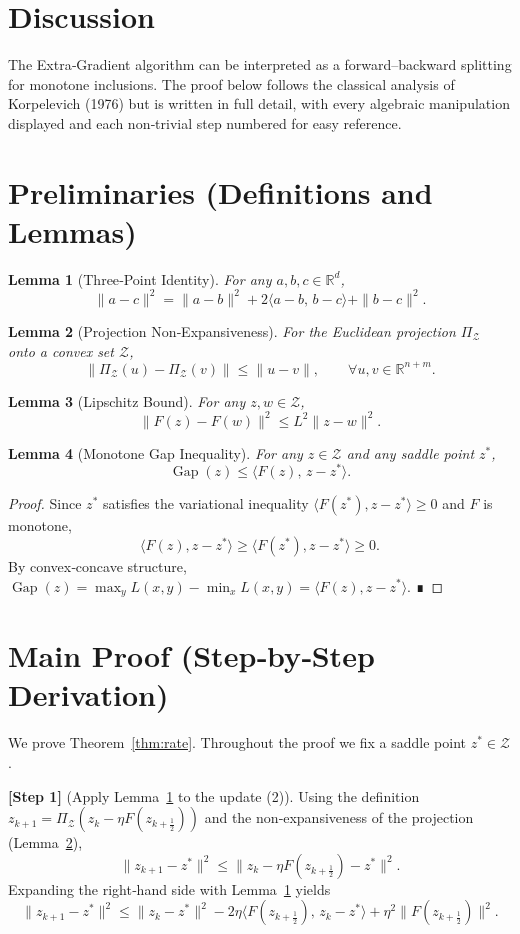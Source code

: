 \documentclass{article}
\newtheorem{lemma}{Lemma}
\newcommand{\R}{\mathbb{R}}
\newcommand{\gap}{\operatorname{Gap}}
\begin{document}
\section*{Discussion}
The Extra‑Gradient algorithm can be interpreted as a forward–backward splitting for monotone inclusions.  The proof below follows the classical analysis of Korpelevich (1976) but is written in full detail, with every algebraic manipulation displayed and each non‑trivial step numbered for easy reference.

\newpage
\section*{Preliminaries (Definitions and Lemmas)}
\begin{lemma}[Three‑Point Identity]\label{lem:3pt}
For any $a,b,c\in\R^{d}$,
\[
\|a-c\|^{2}= \|a-b\|^{2}+2\langle a-b,\,b-c\rangle+\|b-c\|^{2}.
\]
\end{lemma}
\begin{lemma}[Projection Non‑Expansiveness]\label{lem:proj}
For the Euclidean projection $\Pi_{\mathcal Z}$ onto a convex set $\mathcal Z$,
\[
\|\Pi_{\mathcal Z}(u)-\Pi_{\mathcal Z}(v)\|\le\|u-v\|,\qquad\forall u,v\in\R^{n+m}.
\]
\end{lemma}
\begin{lemma}[Lipschitz Bound]\label{lem:lip}
For any $z,w\in\mathcal Z$,
\[
\|F(z)-F(w)\|^{2}\le L^{2}\|z-w\|^{2}.
\]
\end{lemma}
\begin{lemma}[Monotone Gap Inequality]\label{lem:gap}
For any $z\in\mathcal Z$ and any saddle point $z^{*}$,
\[
\gap(z)\le\langle F(z),\,z-z^{*}\rangle .
\]
\end{lemma}
\begin{proof}
Since $z^{*}$ satisfies the variational inequality $\langle F(z^{*}),z-z^{*}\rangle\ge0$ and $F$ is monotone,
\[
\langle F(z),z-z^{*}\rangle\ge\langle F(z^{*}),z-z^{*}\rangle\ge0.
\]
By convex‑concave structure,
$\gap(z)=\max_{y}L(x,y)-\min_{x}L(x,y)=\langle F(z),z-z^{*}\rangle$.  ∎
\end{proof}

\section*{Main Proof (Step‑by‑Step Derivation)}
We prove Theorem~\ref{thm:rate}.  Throughout the proof we fix a saddle point $z^{*}\in\mathcal Z$.

\bigskip
\noindent\textbf{[Step 1]} (Apply Lemma~\ref{lem:3pt} to the update (2)).  
Using the definition $z_{k+1}= \Pi_{\mathcal Z}(z_{k}-\eta F(z_{k+\frac12}))$ and the non‑expansiveness of the projection (Lemma~\ref{lem:proj}),
\[
\|z_{k+1}-z^{*}\|^{2}
\le\|z_{k}-\eta F(z_{k+\frac12})-z^{*}\|^{2}.
\]
Expanding the right‑hand side with Lemma~\ref{lem:3pt} yields
\begin{equation}
\|z_{k+1}-z^{*}\|^{2}
\le\|z_{k}-z^{*}\|^{2}
-2\eta\langle F(z_{k+\frac12}),\,z_{k}-z^{*}\rangle
+\eta^{2}\|F(z_{k+\frac12})\|^{2}.
\tag{3}
\end{equation}
\end{document}
